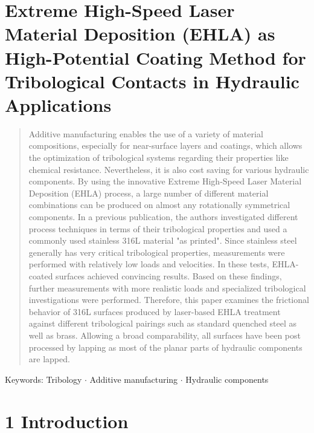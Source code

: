 \documentclass[10pt]{article}
\begin{document}
\section*{Extreme High-Speed Laser Material Deposition (EHLA) as High-Potential Coating Method for Tribological Contacts in Hydraulic Applications }


\begin{abstract}
Additive manufacturing enables the use of a variety of material compositions, especially for near-surface layers and coatings, which allows the optimization of tribological systems regarding their properties like chemical resistance. Nevertheless, it is also cost saving for various hydraulic components. By using the innovative Extreme High-Speed Laser Material Deposition (EHLA) process, a large number of different material combinations can be produced on almost any rotationally symmetrical components. In a previous publication, the authors investigated different process techniques in terms of their tribological properties and used a commonly used stainless 316L material "as printed". Since stainless steel generally has very critical tribological properties, measurements were performed with relatively low loads and velocities. In these tests, EHLA-coated surfaces achieved convincing results. Based on these findings, further measurements with more realistic loads and specialized tribological investigations were performed. Therefore, this paper examines the frictional behavior of 316L surfaces produced by laser-based EHLA treatment against different tribological pairings such as standard quenched steel as well as brass. Allowing a broad comparability, all surfaces have been post processed by lapping as most of the planar parts of hydraulic components are lapped.
\end{abstract}

Keywords: Tribology $\cdot$ Additive manufacturing $\cdot$ Hydraulic components

\section*{1 Introduction}
\end{document}
